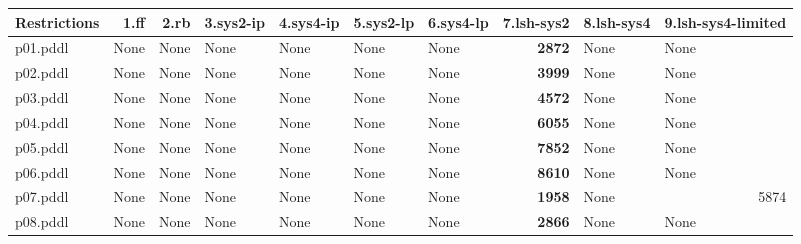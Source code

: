 \documentclass{article}
\begin{document}
\begin{tabular}{@{}lrrrrrrrrr@{}}
Restrictions & 1.ff & 2.rb & 3.sys2-ip & 4.sys4-ip & 5.sys2-lp & 6.sys4-lp & 7.lsh-sys2 & 8.lsh-sys4 & 9.lsh-sys4-limited \\
\midrule
p01.pddl & \multicolumn{1}{|l|}{None} & \multicolumn{1}{|l|}{None} & \multicolumn{1}{|l|}{None} & \multicolumn{1}{|l|}{None} & \multicolumn{1}{|l|}{None} & \multicolumn{1}{|l|}{None} & \textbf{2872} & \multicolumn{1}{|l|}{None} & \multicolumn{1}{|l|}{None} \\
p02.pddl & \multicolumn{1}{|l|}{None} & \multicolumn{1}{|l|}{None} & \multicolumn{1}{|l|}{None} & \multicolumn{1}{|l|}{None} & \multicolumn{1}{|l|}{None} & \multicolumn{1}{|l|}{None} & \textbf{3999} & \multicolumn{1}{|l|}{None} & \multicolumn{1}{|l|}{None} \\
p03.pddl & \multicolumn{1}{|l|}{None} & \multicolumn{1}{|l|}{None} & \multicolumn{1}{|l|}{None} & \multicolumn{1}{|l|}{None} & \multicolumn{1}{|l|}{None} & \multicolumn{1}{|l|}{None} & \textbf{4572} & \multicolumn{1}{|l|}{None} & \multicolumn{1}{|l|}{None} \\
p04.pddl & \multicolumn{1}{|l|}{None} & \multicolumn{1}{|l|}{None} & \multicolumn{1}{|l|}{None} & \multicolumn{1}{|l|}{None} & \multicolumn{1}{|l|}{None} & \multicolumn{1}{|l|}{None} & \textbf{6055} & \multicolumn{1}{|l|}{None} & \multicolumn{1}{|l|}{None} \\
p05.pddl & \multicolumn{1}{|l|}{None} & \multicolumn{1}{|l|}{None} & \multicolumn{1}{|l|}{None} & \multicolumn{1}{|l|}{None} & \multicolumn{1}{|l|}{None} & \multicolumn{1}{|l|}{None} & \textbf{7852} & \multicolumn{1}{|l|}{None} & \multicolumn{1}{|l|}{None} \\
p06.pddl & \multicolumn{1}{|l|}{None} & \multicolumn{1}{|l|}{None} & \multicolumn{1}{|l|}{None} & \multicolumn{1}{|l|}{None} & \multicolumn{1}{|l|}{None} & \multicolumn{1}{|l|}{None} & \textbf{8610} & \multicolumn{1}{|l|}{None} & \multicolumn{1}{|l|}{None} \\
p07.pddl & \multicolumn{1}{|l|}{None} & \multicolumn{1}{|l|}{None} & \multicolumn{1}{|l|}{None} & \multicolumn{1}{|l|}{None} & \multicolumn{1}{|l|}{None} & \multicolumn{1}{|l|}{None} & \textbf{1958} & \multicolumn{1}{|l|}{None} & 5874 \\
p08.pddl & \multicolumn{1}{|l|}{None} & \multicolumn{1}{|l|}{None} & \multicolumn{1}{|l|}{None} & \multicolumn{1}{|l|}{None} & \multicolumn{1}{|l|}{None} & \multicolumn{1}{|l|}{None} & \textbf{2866} & \multicolumn{1}{|l|}{None} & \multicolumn{1}{|l|}{None} \\

\end{tabular}
\end{document}
